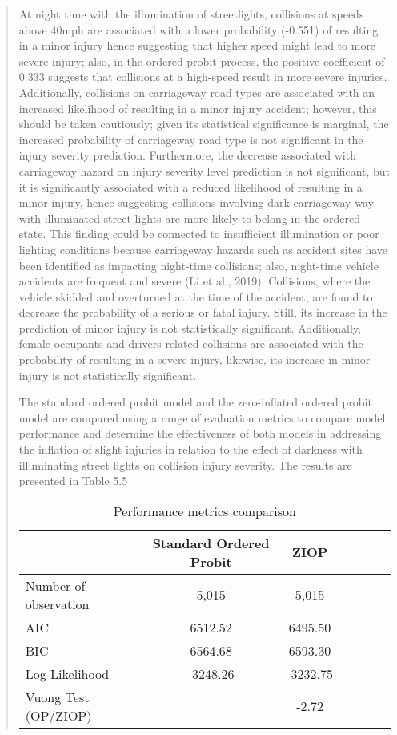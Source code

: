 \documentclass[12]{report}
\begin{document}
\begin{quote}
{At night time with the illumination of streetlights, collisions at speeds above 40mph are associated with a lower probability (-0.551) of resulting in a minor injury hence suggesting that higher speed might lead to more severe injury; also, in the ordered probit process, the positive coefficient of 0.333 suggests that collisions at a high-speed result in more severe injuries.  Additionally, collisions on carriageway road types are associated with an increased likelihood of resulting in a minor injury accident; however, this should be taken cautiously; given its statistical significance is marginal, the increased probability of carriageway road type is not significant in the injury severity prediction. Furthermore, the decrease associated with carriageway hazard on injury severity level prediction is not significant, but it is significantly associated with a reduced likelihood of resulting in a minor injury, hence suggesting collisions involving dark carriageway way with illuminated street lights are more likely to belong in the ordered state. This finding could be connected to insufficient illumination or poor lighting conditions because carriageway hazards such as accident sites have been identified as impacting night-time collisions; also, night-time vehicle accidents are frequent and severe (Li et al., 2019). Collisions, where the vehicle skidded and overturned at the time of the accident, are found to decrease the probability of a serious or fatal injury. Still, its increase in the prediction of minor injury is not statistically significant. Additionally,
 female occupants and drivers related collisions are associated with the probability of resulting in a severe injury, likewise, its increase in minor injury is not statistically significant.

The standard ordered probit model and the zero-inflated ordered probit model are compared using a  range of evaluation metrics to compare model performance and determine the effectiveness of both models in addressing the inflation of slight injuries in relation to the effect of darkness with illuminating street lights on collision injury severity. The results are presented in Table 5.5 

\begin{table}[H]
\renewcommand{\arraystretch}{1.3}
\centering
\begin{tabular}{p{8cm} ccc ccc}
\toprule
 & \textbf{Standard Ordered Probit} & \textbf{ZIOP} \\
\hline
Number of observation & 5,015 & 5,015 \\
AIC & 6512.52 & 6495.50 \\
BIC & 6564.68 & 6593.30 \\
Log-Likelihood & -3248.26 & -3232.75 \\
Vuong Test (OP/ZIOP) & & -2.72 \\
\hline
\end{tabular}
\caption{Performance metrics comparison}
\end{table}


}
\end{quote}
\end{document}
